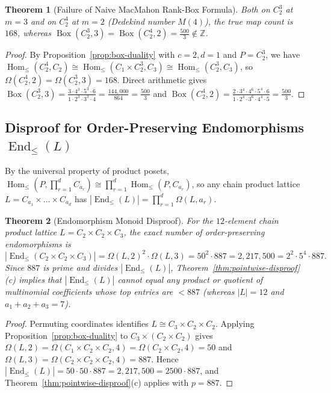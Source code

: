 \documentclass[11pt,a4paper]{article}
\newtheorem{theorem}{Theorem}[section]
\theoremstyle{definition}
\newcommand{\Homle}{\operatorname{Hom}_{\le}}
\newcommand{\Endle}{\operatorname{End}_{\le}}
\newcommand{\BoxProd}{\operatorname{Box}}
\begin{document}
\begin{theorem}[Failure of Naive MacMahon Rank-Box Formula]\label{thm:naive-box}
Both on $C_2^3$ at $m = 3$ and on $C_2^4$ at $m = 2$ (Dedekind number $M(4)$), the true map count is
$168$, whereas $\BoxProd(C_2^3, 3) = \BoxProd(C_2^4, 2) = \frac{500}{3} \notin \mathbb{Z}$.
\end{theorem}

\begin{proof}
By Proposition~\ref{prop:box-duality} with $c = 2, d = 1$ and $P = C_2^3$, we have
$\Homle(C_2^4, C_2) \cong \Homle(C_1 \times C_2^3, C_3) \cong \Homle(C_2^3, C_3)$, so
$\Omega(C_2^4, 2) = \Omega(C_2^3, 3) = 168$. Direct arithmetic gives $\BoxProd(C_2^3, 3) =
\frac{3 \cdot 4^3 \cdot 5^3 \cdot 6}{1 \cdot 2^3 \cdot 3^3 \cdot 4} = \frac{144{,}000}{864} =
\frac{500}{3}$ and $\BoxProd(C_2^4, 2) = \frac{2 \cdot 3^4 \cdot 4^6 \cdot 5^4 \cdot 6}{1 \cdot 2^4
\cdot 3^6 \cdot 4^4 \cdot 5} = \frac{500}{3}$.
\end{proof}

\subsection{Disproof for Order-Preserving Endomorphisms \texorpdfstring{$\Endle(L)$}{End\_<=(L)}}

By the universal property of product posets, $\Homle(P, \prod_{r=1}^d C_{a_r}) \cong \prod_{r=1}^d
\Homle(P, C_{a_r})$, so any chain product lattice $L = C_{a_1} \times \dots \times C_{a_d}$ has
$|\Endle(L)| = \prod_{r=1}^d \Omega(L, a_r)$.

\begin{theorem}[Endomorphism Monoid Disproof]\label{thm:endomorphism}
For the $12$-element chain product lattice $L = C_2 \times C_2 \times C_3$, the exact number of
order-preserving endomorphisms is
\[
  |\Endle(C_2 \times C_2 \times C_3)|
  = \Omega(L, 2)^2 \cdot \Omega(L, 3)
  = 50^2 \cdot 887 = 2{,}217{,}500 = 2^2 \cdot 5^4 \cdot 887.
\]
Since $887$ is prime and divides $|\Endle(L)|$, Theorem~\ref{thm:pointwise-disproof}(c) implies that
$|\Endle(L)|$ cannot equal any product or quotient of multinomial coefficients whose top entries are
$< 887$ (whereas $|L| = 12$ and $a_1 + a_2 + a_3 = 7$).
\end{theorem}

\begin{proof}
Permuting coordinates identifies $L \cong C_3 \times C_2 \times C_2$. Applying
Proposition~\ref{prop:box-duality} to $C_3 \times (C_2 \times C_2)$ gives
$\Omega(L, 2) = \Omega(C_1 \times C_2 \times C_2, 4) = \Omega(C_2 \times C_2, 4) = 50$ and
$\Omega(L, 3) = \Omega(C_2 \times C_2 \times C_2, 4) = 887$. Hence $|\Endle(L)| = 50 \cdot 50 \cdot
887 = 2{,}217{,}500 = 2500 \cdot 887$, and Theorem~\ref{thm:pointwise-disproof}(c) applies with
$p = 887$.
\end{proof}
\end{document}
